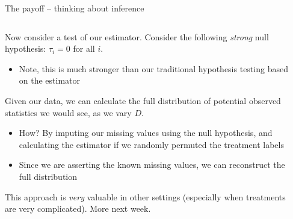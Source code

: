 \documentclass[notes,11pt, aspectratio=169]{beamer}
\newenvironment{wideitemize}{\itemize\addtolength{\itemsep}{10pt}}{\enditemize}
\begin{document}
\begin{frame}{The payoff -- thinking about inference}
\begin{columns}[T] %
  \begin{column}{.7\textwidth}
  \begin{wideitemize}
  \item Now consider a test of our estimator. Consider the following
    \emph{strong} null hypothesis: $\tau_{i} = 0$ for all $i$.
    \begin{itemize}
    \item Note, this is much stronger than our traditional hypothesis
      testing based on the estimator
    \end{itemize}
  \item Given our data, we can calculate the full distribution of
    potential observed statistics we would see, as we vary $D$.
    \begin{itemize}
    \item How? By imputing our missing values using the null
      hypothesis, and calculating the estimator if we randomly permuted the treatment labels
    \item Since we are asserting the known missing values, we can reconstruct the full distribution
    \end{itemize}
  \item This approach is \emph{very} valuable in other settings
    (especially when treatments are very complicated). More next week.
  \end{wideitemize}
  \end{column}%
  \hfill%
  \begin{column}{.4\textwidth}
\end{column}
\end{columns}
\end{frame}
\end{document}
